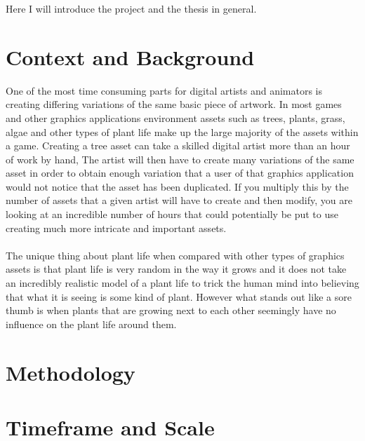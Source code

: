 Here I will introduce the project and the thesis in general.\\

\section{Context and Background}
One of the most time consuming parts for digital artists and animators is creating differing variations of the same basic piece of artwork. In most games and other graphics applications environment assets such as trees, plants, grass, algae and other types of plant life make up the large majority of the assets within a game. Creating a tree asset can take a skilled digital artist more than an hour of work by hand, The artist will then have to create many variations of the same asset in order to obtain enough variation that a user of that graphics application would not notice that the asset has been duplicated. If you multiply this by the number of assets that a given artist will have to create and then modify, you are looking at an incredible number of hours that could potentially be put to use creating much more intricate and important assets.\\
\\
The unique thing about plant life when compared with other types of graphics assets is that plant life is very random in the way it grows and it does not take an incredibly realistic model of a plant life to trick the human mind into believing that what it is seeing is some kind of plant. However what stands out like a sore thumb is when plants that are growing next to each other seemingly have no influence on the plant life around them.\\

\section{Methodology}

\section{Timeframe and Scale}

